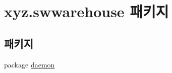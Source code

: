 \hypertarget{namespacexyz_1_1swwarehouse}{\section{xyz.\-swwarehouse 패키지}
\label{namespacexyz_1_1swwarehouse}
}
\subsection*{패키지}
\begin{DoxyCompactItemize}
\item 
package \hyperlink{namespacexyz_1_1swwarehouse_1_1daemon}{daemon}
\end{DoxyCompactItemize}
